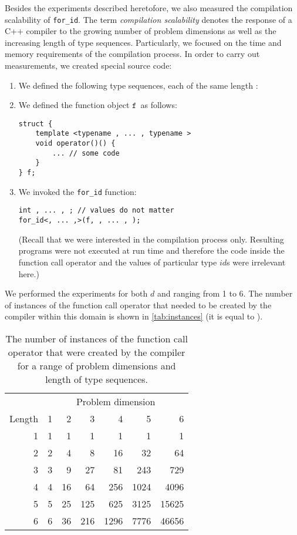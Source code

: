 \documentclass[10pt,a4paper]{article}
\theoremstyle{definition}\newtheorem{problem}{Problem}
\providecommand{\symdim}{\ensuremath{d}\xspace}
\providecommand{\symfunctor}{\ensuremath{\mathtt{f}}}
\providecommand{\symidb}{\ensuremath{\mathit{id}}}
\providecommand{\forid}{\texttt{for\_id}\xspace}
\begin{document}
Besides the experiments described heretofore, we also measured the compilation scalability of \forid. The term \emph{compilation scalability} denotes the response of a C++ compiler to the growing number of problem dimensions as well as the increasing length of type sequences. Particularly, we focused on the time and memory requirements of the compilation process. In order to carry out measurements, we created special source code:
\begin{enumerate}
\item We defined the following type sequences, each of the same length :  


\item We defined the function object \symfunctor\ as follows:
\begin{lstlisting}
struct {
    template <typename , ... , typename >
    void operator()() {
        ... // some code
    }
} f;
\end{lstlisting}

\item We invoked the \forid function:
\begin{lstlisting}
int , ... , ; // values do not matter
for_id<, ... ,>(f, , ... , );
\end{lstlisting}
(Recall that we were interested in the compilation process only. Resulting programs were not executed at run time and therefore the code inside the function call operator and the values of particular type \symidb s were irrelevant here.)

\end{enumerate}

We performed the experiments for both \symdim and  ranging from 1 to 6. The number of instances of the function call operator that needed to be created by the compiler within this domain is shown in \autoref{tab:instances} (it is equal to ).
\renewcommand{\arraystretch}{1.00}
\renewcommand{\tabcolsep}{3mm}
\begin{table}[t]
\caption{The number of instances of the function call operator that were created by the compiler for a range of problem dimensions and length of type sequences.} \begin{center}
\begin{tabular}{r*{6}{r}}
\toprule
 & \multicolumn{6}{c}{Problem dimension } \\ \cmidrule(l){2-7}
Length  & 1 & 2 & 3 & 4 & 5 & 6 \\ \cmidrule(r){1-1} \cmidrule(l){2-7}
1 & 1 & 1 & 1 & 1 & 1 & 1 \\
2 & 2 & 4 & 8 & 16 & 32 & 64 \\
3 & 3 & 9 & 27 & 81 & 243 & 729 \\
4 & 4 & 16 & 64 & 256 & 1024 & 4096 \\
5 & 5 & 25 & 125 & 625 & 3125 & 15625 \\
6 & 6 & 36 & 216 & 1296 & 7776 & 46656 \\
\bottomrule
\end{tabular}
\end{center}
\label{tab:instances}
\end{table}
\end{document}
